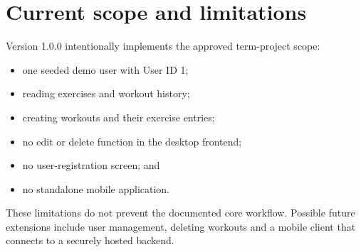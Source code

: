 \documentclass[11pt,a4paper]{article}
\begin{document}
\section{Current scope and limitations}

Version 1.0.0 intentionally implements the approved term-project scope:

\begin{itemize}[leftmargin=1.4em]
  \item one seeded demo user with User ID 1;
  \item reading exercises and workout history;
  \item creating workouts and their exercise entries;
  \item no edit or delete function in the desktop frontend;
  \item no user-registration screen; and
  \item no standalone mobile application.
\end{itemize}

These limitations do not prevent the documented core workflow. Possible future
extensions include user management, deleting workouts and a mobile client that
connects to a securely hosted backend.
\end{document}
